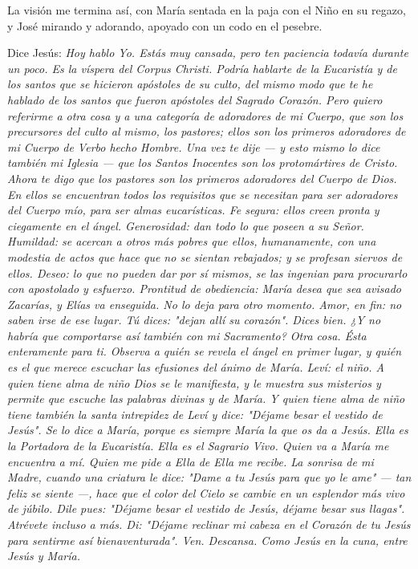\documentclass[12pt]{book} %
\begin{document}
La visión me termina así, con María sentada en la paja con el Niño en su regazo, y José mirando y adorando, apoyado con un codo en el pesebre. 

Dice Jesús: 
\emph{Hoy hablo Yo. Estás muy cansada, pero ten paciencia todavía durante un poco. Es la víspera del Corpus Christi. Podría hablarte de la Eucaristía y de los santos que se hicieron apóstoles de su culto, del mismo modo que te he hablado de los santos que fueron apóstoles del Sagrado Corazón. Pero quiero referirme a otra cosa y a una categoría de adoradores de mi Cuerpo, que son los precursores del culto al mismo, los pastores; ellos son los primeros adoradores de mi Cuerpo de Verbo hecho Hombre. Una vez te dije — y esto mismo lo dice también mi Iglesia — que los Santos Inocentes son los protomártires de Cristo. Ahora te digo que los pastores son los primeros adoradores del Cuerpo de Dios. En ellos se encuentran todos los requisitos que se necesitan para ser adoradores del Cuerpo mío, para ser almas eucarísticas. Fe segura: ellos creen pronta y ciegamente en el ángel. Generosidad: dan todo lo que poseen a su Señor. Humildad: se acercan a otros más pobres que ellos, humanamente, con una modestia de actos que hace que no se sientan rebajados; y se profesan siervos de ellos. Deseo: lo que no pueden dar por sí mismos, se las ingenian para procurarlo con apostolado y esfuerzo. Prontitud de obediencia: María desea que sea avisado Zacarías, y Elías va enseguida. No lo deja para otro momento. Amor, en fin: no saben irse de ese lugar. Tú dices: "dejan allí su corazón". Dices bien. ¿Y no habría que comportarse así también con mi Sacramento? Otra cosa. Ésta enteramente para ti. Observa a quién se revela el ángel en primer lugar, y quién es el que merece escuchar las efusiones del ánimo de María. Leví: el niño. A quien tiene alma de niño Dios se le manifiesta, y le muestra sus misterios y permite que escuche las palabras divinas y de María. Y quien tiene alma de niño tiene también la santa intrepidez de Leví y dice: "Déjame besar el vestido de Jesús". Se lo dice a María, porque es siempre María la que os da a Jesús. Ella es la Portadora de la Eucaristía. Ella es el Sagrario Vivo. Quien va a María me encuentra a mí. Quien me pide a Ella de Ella me recibe. La sonrisa de mi Madre, cuando una criatura le dice: "Dame a tu Jesús para que yo le ame" — tan feliz se siente —, hace que el color del Cielo se cambie en un esplendor más vivo de júbilo. Dile pues: "Déjame besar el vestido de Jesús, déjame besar sus llagas". Atrévete incluso a más. Di: "Déjame reclinar mi cabeza en el Corazón de tu Jesús para sentirme así bienaventurada". Ven. Descansa. Como Jesús en la cuna, entre Jesús y María.  }
\end{document}
